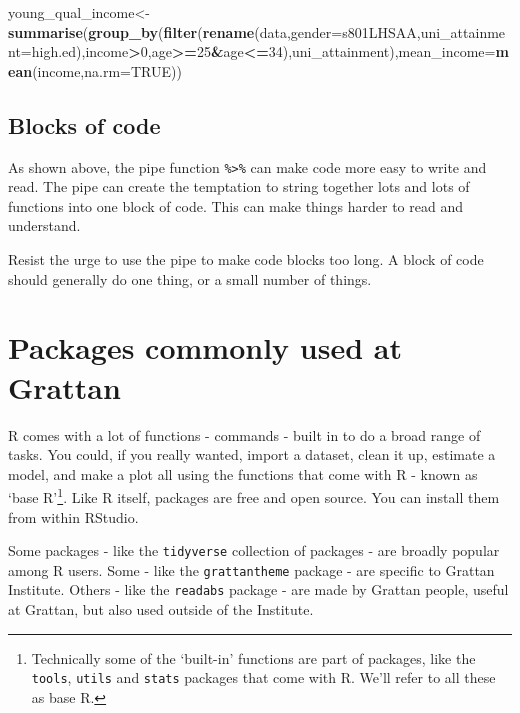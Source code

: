 \documentclass[]{book}
\newenvironment{Shaded}{\begin{snugshade}}{\end{snugshade}}
\newcommand{\DataTypeTok}[1]{\textcolor[rgb]{0.13,0.29,0.53}{#1}}
\newcommand{\DecValTok}[1]{\textcolor[rgb]{0.00,0.00,0.81}{#1}}
\newcommand{\KeywordTok}[1]{\textcolor[rgb]{0.13,0.29,0.53}{\textbf{#1}}}
\newcommand{\NormalTok}[1]{#1}
\newcommand{\OperatorTok}[1]{\textcolor[rgb]{0.81,0.36,0.00}{\textbf{#1}}}
\newcommand{\OtherTok}[1]{\textcolor[rgb]{0.56,0.35,0.01}{#1}}
\let\rmarkdownfootnote\footnote%
\def\footnote{\protect\rmarkdownfootnote}
\begin{document}
\begin{Shaded}
\begin{Highlighting}[]
\NormalTok{young_qual_income<-}\KeywordTok{summarise}\NormalTok{(}\KeywordTok{group_by}\NormalTok{(}\KeywordTok{filter}\NormalTok{(}\KeywordTok{rename}\NormalTok{(data,}\DataTypeTok{gender=}\NormalTok{s801LHSAA,}\DataTypeTok{uni_attainment=}\NormalTok{high.ed),income}\OperatorTok{>}\DecValTok{0}\NormalTok{,age}\OperatorTok{>=}\DecValTok{25}\OperatorTok{&}\NormalTok{age}\OperatorTok{<=}\DecValTok{34}\NormalTok{),uni_attainment),}\DataTypeTok{mean_income=}\KeywordTok{mean}\NormalTok{(income,}\DataTypeTok{na.rm=}\OtherTok{TRUE}\NormalTok{))}
\end{Highlighting}
\end{Shaded}

\hypertarget{blocks-of-code}{%
\section{Blocks of code}\label{blocks-of-code}}

As shown above, the pipe function \texttt{\%\textgreater{}\%} can make code more easy to write and read. The pipe can create the temptation to string together lots and lots of functions into one block of code. This can make things harder to read and understand.

Resist the urge to use the pipe to make code blocks too long. A block of code should generally do one thing, or a small number of things.

\hypertarget{packages-commonly-used-at-grattan}{%
\chapter{Packages commonly used at Grattan}\label{packages-commonly-used-at-grattan}}

R comes with a lot of functions - commands - built in to do a broad range of tasks. You could, if you really wanted, import a dataset, clean it up, estimate a model, and make a plot all using the functions that come with R - known as `base R'\footnote{Technically some of the `built-in' functions are part of packages, like the \texttt{tools}, \texttt{utils} and \texttt{stats} packages that come with R. We'll refer to all these as base R.}. Like R itself, packages are free and open source. You can install them from within RStudio.

Some packages - like the \texttt{tidyverse} collection of packages - are broadly popular among R users. Some - like the \texttt{grattantheme} package - are specific to Grattan Institute. Others - like the \texttt{readabs} package - are made by Grattan people, useful at Grattan, but also used outside of the Institute.
\end{document}
